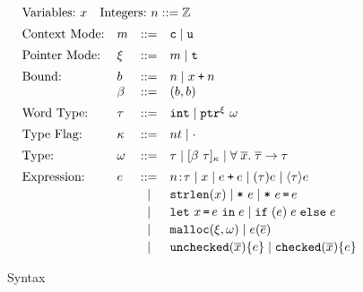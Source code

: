 
\begin{figure}
  \small \centering
  \[ \hspace*{-1.2em}
\begin{array}{l}
\begin{array}{ll}
       \text{Variables:}~ x
& \text{Integers:}~n::=\mathbb{Z} 
\end{array}
\\[0.5em]

\begin{array}{llcllcl}

\text{Context Mode:} & m & ::= & \texttt{c} \mid \texttt{u} \\[0.5em]

\text{Pointer Mode:} & \xi & ::= & m \mid \texttt{t} \\[0.5em]

\text{Bound:} & b & ::= & n \mid x \mathbin{\texttt{+}} n \\
              & \beta & ::= & (b,b) \\[0.5em]
  
     \text{Word Type:}& \tau &::=& \mathtt{int}\mid \mathtt{ptr}^{ \xi}~{\omega}
\\[0.5em]

\text{Type Flag:}&\kappa &::=& nt \mid \cdot
\\[0.5em]

\text{Type:}&\omega &::=& \tau \mid [{\beta}~{\tau}]_{\kappa} \mid \forall \;\overline{x}.\;{\overline{\tau}}\to\tau
\\[0.5em]

\text{Expression:}& e & ::= & 
{n}\!:\!{\tau} \mid x \mid e \mathbin{\texttt{+}} e\mid \mathtt{(}{\tau}\mathtt{)}{e} \mid \langle{\tau}\rangle{e}  \\[0.2em]
&&\mid& \mathtt{strlen}({x}) \mid\texttt{*}~{e}\mid\texttt{*}~{e}\,\texttt{=}\, {e}  \\[0.2em]
&&\mid& \mathtt{let}~x\, \texttt{=}\, e~\mathtt{in}\;{e} \mid \mathtt{if\;}(e)\;{e}\;\mathtt{else}\;{e}
\\[0.2em]
&&\mid&  \mathtt{malloc}({\xi},{\omega}) \mid {e}({\overline{e}})
\\[0.2em]
&&\mid&\mathtt{unchecked}({\overline{x}})\{e\}
\mid \mathtt{checked}({\overline{x}}){\{e\}}

\end{array}
    \end{array}
  \]
  \caption{\lang Syntax}
  \label{fig:checkc-syn}
\end{figure}

